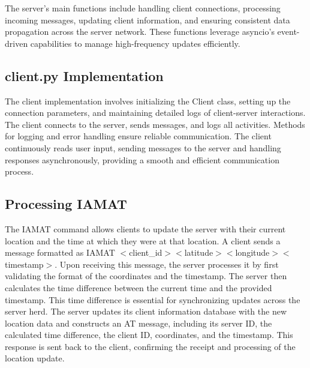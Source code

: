 \documentclass[letterpaper,twocolumn,10pt]{article}
\begin{document}
\noindent{}The server’s main functions include handling client connections, processing incoming messages, updating client information, and ensuring consistent data propagation across the server network. These functions leverage asyncio’s event-driven capabilities to manage high-frequency updates efficiently.

\subsection{client.py Implementation}
\noindent{}The client implementation involves initializing the Client class, setting up the connection parameters, and maintaining detailed logs of client-server interactions. The client connects to the server, sends messages, and logs all activities. Methods for logging and error handling ensure reliable communication. The client continuously reads user input, sending messages to the server and handling responses asynchronously, providing a smooth and efficient communication process.

\subsection{Processing IAMAT}
\noindent{}The IAMAT command allows clients to update the server with their current location and the time at which they were at that location. A client sends a message formatted as IAMAT $<$client\_id$> <$latitude$><$longitude$> <$timestamp$>$. Upon receiving this message, the server processes it by first validating the format of the coordinates and the timestamp. The server then calculates the time difference between the current time and the provided timestamp. This time difference is essential for synchronizing updates across the server herd. The server updates its client information database with the new location data and constructs an AT message, including its server ID, the calculated time difference, the client ID, coordinates, and the timestamp. This response is sent back to the client, confirming the receipt and processing of the location update.

\end{document}
